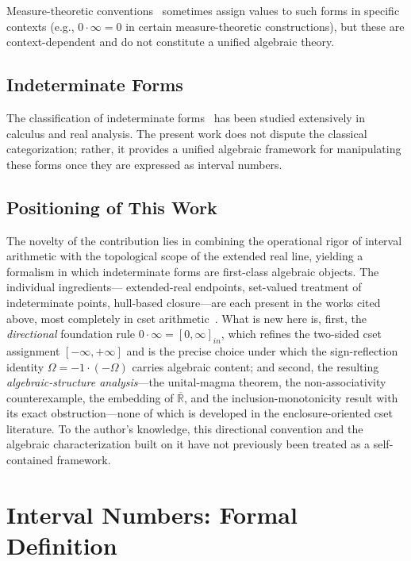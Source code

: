 \documentclass[11pt,a4paper]{article}
\theoremstyle{paperdef}
\newcommand{\Rext}{\overline{\mathbb{R}}}
\newcommand{\inI}[1]{[#1]_{in}}
\begin{document}
Measure-theoretic conventions~\cite{Folland1999} sometimes assign
values to such forms in specific contexts (e.g., $0 \cdot \infty = 0$
in certain measure-theoretic constructions), but these are
context-dependent and do not constitute a unified algebraic theory.

\subsection{Indeterminate Forms}

The classification of indeterminate forms~\cite{Apostol1974} has been
studied extensively in calculus and real analysis. The present work
does not dispute the classical categorization; rather, it provides a
unified algebraic framework for manipulating these forms once they are
expressed as interval numbers.

\subsection{Positioning of This Work}

The novelty of the contribution lies in combining the operational
rigor of interval arithmetic with the topological scope of the
extended real line, yielding a formalism in which indeterminate forms
are first-class algebraic objects. The individual ingredients---
extended-real endpoints, set-valued treatment of indeterminate
points, hull-based closure---are each present in the works cited
above, most completely in cset
arithmetic~\cite{Walster1998,PryceCorliss2006}. What is new here is,
first, the \emph{directional} foundation rule
$0 \cdot \infty = \inI{0, \infty}$, which refines the two-sided cset
assignment $[-\infty, +\infty]$ and is the precise choice under which
the sign-reflection identity $\Omega = -1 \cdot (-\Omega)$ carries
algebraic content; and second, the resulting \emph{algebraic-structure
analysis}---the unital-magma theorem, the non-associativity
counterexample, the embedding of $\Rext$, and the inclusion-monotonicity
result with its exact obstruction---none of which is developed in the
enclosure-oriented cset literature. To the author's knowledge, this
directional convention and the algebraic characterization built on it
have not previously been treated as a self-contained framework.

\section{Interval Numbers: Formal Definition}\label{sec:interval-numbers}
\end{document}

